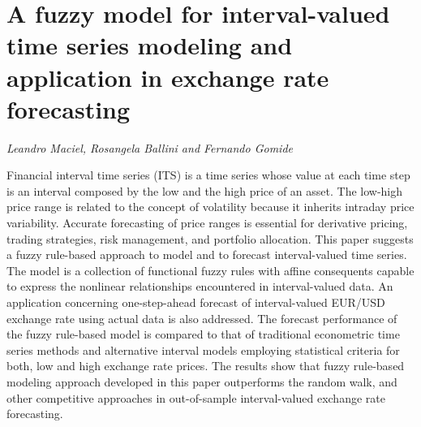 \documentclass[../booklet.tex]{subfiles}
\begin{document}
\section[A fuzzy model for interval-valued time series modeling and application in exchange rate forecasting. {\it Leandro Maciel, Rosangela Ballini and Fernando Gomide}]{A fuzzy model for interval-valued time series modeling and application in exchange rate forecasting}
  

\begin{center}
  {\it Leandro Maciel, Rosangela Ballini and Fernando Gomide}
\end{center}

\vskip 0.8cm

 Financial interval time series (ITS) is a time series whose value at each time step is an interval composed by the low and the high price of an asset. The low-high price range is related to the concept of volatility because it inherits intraday price variability. Accurate forecasting of price ranges is essential for derivative pricing, trading strategies, risk management, and portfolio allocation. This paper suggests a fuzzy rule-based approach to model and to forecast interval-valued time series. The model is a collection of functional fuzzy rules with affine consequents capable to express the nonlinear relationships encountered in interval-valued data. An application concerning one-step-ahead forecast of interval-valued EUR/USD exchange rate using actual data is also addressed.  The forecast performance of the fuzzy rule-based model is compared to that of traditional econometric time series methods and alternative interval models employing statistical criteria for both, low and high exchange rate prices. The results show that fuzzy rule-based modeling approach developed in this paper outperforms the random walk, and other competitive approaches in out-of-sample interval-valued exchange rate forecasting.

\end{document}
